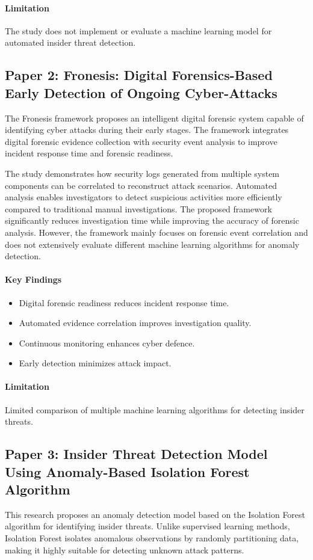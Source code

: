 \paragraph{Limitation}
The study does not implement or evaluate a machine learning model for automated insider threat detection.

\subsection*{Paper 2: Fronesis: Digital Forensics-Based Early Detection of Ongoing Cyber-Attacks}
The Fronesis framework proposes an intelligent digital forensic system capable of identifying cyber attacks during their early stages. The framework integrates digital forensic evidence collection with security event analysis to improve incident response time and forensic readiness.

The study demonstrates how security logs generated from multiple system components can be correlated to reconstruct attack scenarios. Automated analysis enables investigators to detect suspicious activities more efficiently compared to traditional manual investigations. The proposed framework significantly reduces investigation time while improving the accuracy of forensic analysis. However, the framework mainly focuses on forensic event correlation and does not extensively evaluate different machine learning algorithms for anomaly detection.

\paragraph{Key Findings}
\begin{itemize}
  \item Digital forensic readiness reduces incident response time.
  \item Automated evidence correlation improves investigation quality.
  \item Continuous monitoring enhances cyber defence.
  \item Early detection minimizes attack impact.
\end{itemize}
\paragraph{Limitation}
Limited comparison of multiple machine learning algorithms for detecting insider threats.

\subsection*{Paper 3: Insider Threat Detection Model Using Anomaly-Based Isolation Forest Algorithm}
This research proposes an anomaly detection model based on the Isolation Forest algorithm for identifying insider threats. Unlike supervised learning methods, Isolation Forest isolates anomalous observations by randomly partitioning data, making it highly suitable for detecting unknown attack patterns.

